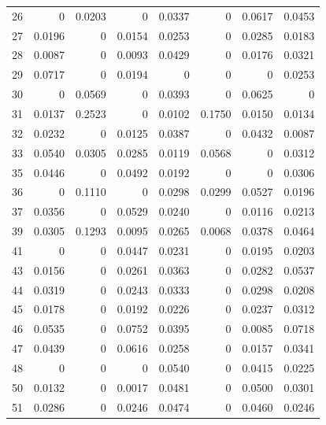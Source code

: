 \begin{table}[H]
\begin{tabular}{rrrrrrrr}
26 & 0 & 0.0203 & 0 & 0.0337 & 0 & 0.0617 & 0.0453 \\
27 & 0.0196 & 0 & 0.0154 & 0.0253 & 0 & 0.0285 & 0.0183 \\
28 & 0.0087 & 0 & 0.0093 & 0.0429 & 0 & 0.0176 & 0.0321 \\
29 & 0.0717 & 0 & 0.0194 & 0 & 0 & 0 & 0.0253 \\
30 & 0 & 0.0569 & 0 & 0.0393 & 0 & 0.0625 & 0 \\
31 & 0.0137 & 0.2523 & 0 & 0.0102 & 0.1750 & 0.0150 & 0.0134 \\
32 & 0.0232 & 0 & 0.0125 & 0.0387 & 0 & 0.0432 & 0.0087 \\
33 & 0.0540 & 0.0305 & 0.0285 & 0.0119 & 0.0568 & 0 & 0.0312 \\
35 & 0.0446 & 0 & 0.0492 & 0.0192 & 0 & 0 & 0.0306 \\
36 & 0 & 0.1110 & 0 & 0.0298 & 0.0299 & 0.0527 & 0.0196 \\
37 & 0.0356 & 0 & 0.0529 & 0.0240 & 0 & 0.0116 & 0.0213 \\
39 & 0.0305 & 0.1293 & 0.0095 & 0.0265 & 0.0068 & 0.0378 & 0.0464 \\
41 & 0 & 0 & 0.0447 & 0.0231 & 0 & 0.0195 & 0.0203 \\
43 & 0.0156 & 0 & 0.0261 & 0.0363 & 0 & 0.0282 & 0.0537 \\
44 & 0.0319 & 0 & 0.0243 & 0.0333 & 0 & 0.0298 & 0.0208 \\
45 & 0.0178 & 0 & 0.0192 & 0.0226 & 0 & 0.0237 & 0.0312 \\
46 & 0.0535 & 0 & 0.0752 & 0.0395 & 0 & 0.0085 & 0.0718 \\
47 & 0.0439 & 0 & 0.0616 & 0.0258 & 0 & 0.0157 & 0.0341 \\
48 & 0 & 0 & 0 & 0.0540 & 0 & 0.0415 & 0.0225 \\
50 & 0.0132 & 0 & 0.0017 & 0.0481 & 0 & 0.0500 & 0.0301 \\
51 & 0.0286 & 0 & 0.0246 & 0.0474 & 0 & 0.0460 & 0.0246 \\
\bottomrule
\end{tabular}
\end{table}


